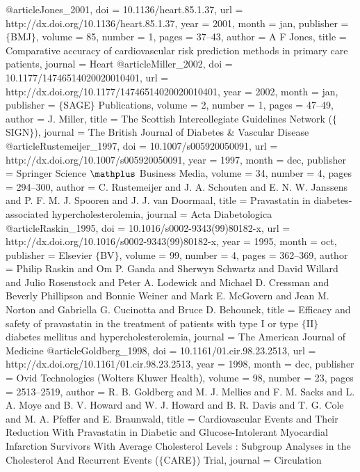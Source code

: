 @article{Jones_2001,
	doi = {10.1136/heart.85.1.37},
	url = {http://dx.doi.org/10.1136/heart.85.1.37},
	year = 2001,
	month = {jan},
	publisher = {$\lbrace$BMJ$\rbrace$},
	volume = {85},
	number = {1},
	pages = {37--43},
	author = {A F Jones},
	title = {Comparative accuracy of cardiovascular risk prediction methods in primary care patients},
	journal = {Heart}
}
@article{Miller_2002,
	doi = {10.1177/14746514020020010401},
	url = {http://dx.doi.org/10.1177/14746514020020010401},
	year = 2002,
	month = {jan},
	publisher = {$\lbrace$SAGE$\rbrace$ Publications},
	volume = {2},
	number = {1},
	pages = {47--49},
	author = {J. Miller},
	title = {The Scottish Intercollegiate Guidelines Network ($\lbrace$SIGN$\rbrace$)},
	journal = {The British Journal of Diabetes {\&} Vascular Disease}
}
@article{Rustemeijer_1997,
	doi = {10.1007/s005920050091},
	url = {http://dx.doi.org/10.1007/s005920050091},
	year = 1997,
	month = {dec},
	publisher = {Springer Science $\mathplus$ Business Media},
	volume = {34},
	number = {4},
	pages = {294--300},
	author = {C. Rustemeijer and J. A. Schouten and E. N. W. Janssens and P. F. M. J. Spooren and J. J. van Doormaal},
	title = {Pravastatin in diabetes-associated hypercholesterolemia},
	journal = {Acta Diabetologica}
}
@article{Raskin_1995,
	doi = {10.1016/s0002-9343(99)80182-x},
	url = {http://dx.doi.org/10.1016/s0002-9343(99)80182-x},
	year = 1995,
	month = {oct},
	publisher = {Elsevier $\lbrace$BV$\rbrace$},
	volume = {99},
	number = {4},
	pages = {362--369},
	author = {Philip Raskin and Om P. Ganda and Sherwyn Schwartz and David Willard and Julio Rosenstock and Peter A. Lodewick and Michael D. Cressman and Beverly Phillipson and Bonnie Weiner and Mark E. McGovern and Jean M. Norton and Gabriella G. Cucinotta and Bruce D. Behounek},
	title = {Efficacy and safety of pravastatin in the treatment of patients with type I or type $\lbrace$II$\rbrace$ diabetes mellitus and hypercholesterolemia},
	journal = {The American Journal of Medicine}
}
@article{Goldberg_1998,
	doi = {10.1161/01.cir.98.23.2513},
	url = {http://dx.doi.org/10.1161/01.cir.98.23.2513},
	year = 1998,
	month = {dec},
	publisher = {Ovid Technologies (Wolters Kluwer Health)},
	volume = {98},
	number = {23},
	pages = {2513--2519},
	author = {R. B. Goldberg and M. J. Mellies and F. M. Sacks and L. A. Moye and B. V. Howard and W. J. Howard and B. R. Davis and T. G. Cole and M. A. Pfeffer and E. Braunwald},
	title = {Cardiovascular Events and Their Reduction With Pravastatin in Diabetic and Glucose-Intolerant Myocardial Infarction Survivors With Average Cholesterol Levels : Subgroup Analyses in the Cholesterol And Recurrent Events ($\lbrace$CARE$\rbrace$) Trial},
	journal = {Circulation}
}
